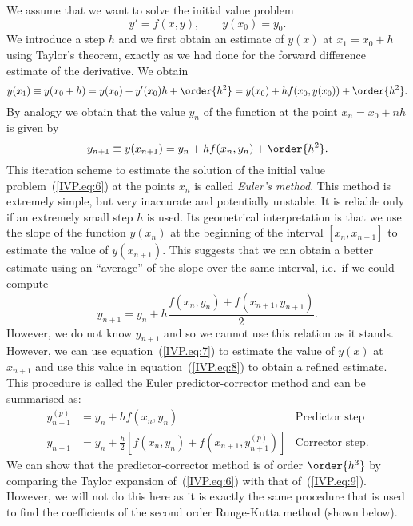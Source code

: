 We assume that we want to solve the initial value problem
%
\begin{equation}
  y' = f(x,y) , \qquad y(x_0) = y_0 .
  \label{IVP.eq:6}
\end{equation}
%
We introduce a step $h$ and we first obtain an estimate of $y(x)$ at
$x_1 = x_0 + h$ using Taylor's theorem, exactly as we had done for the
forward difference estimate of the derivative.  We obtain
%
\begin{equation}
  y(x_1) \equiv y(x_0+h) = y(x_0) + y'(x_0) h + \order{h^2} =
  y(x_0) + h f(x_0,y(x_0)) + \order{h^2} .
  \label{IVP.eq:7}
\end{equation}
%
By analogy we obtain that the value $y_n$ of the function at the point
$x_n = x_0 + n h$ is given by
%
\begin{equation}
  y_{n+1} \equiv y(x_{n+1}) = y_{n} + h f(x_{n},y_{n}) + \order{h^2} .
  \label{IVP.eq:10}
\end{equation}
%
This iteration scheme to estimate the solution of the initial value
problem~(\ref{IVP.eq:6}) at the points $x_n$ is called \textit{Euler's
  method}.  This method is extremely simple, but very inaccurate and
potentially unstable.  It is reliable only if an extremely small step
$h$ is used.  Its geometrical interpretation is that we use the slope
of the function $y(x_n)$ at the beginning of the interval
$[x_n,x_{n+1}]$ to estimate the value of $y(x_{n+1})$.  This suggests
that we can obtain a better estimate using an ``average'' of the slope
over the same interval, i.e.\ if we could compute
%
\begin{equation}
  y_{n+1} = y_n + h \frac{f(x_n,y_n) + f(x_{n+1},y_{n+1})}{2} .
  \label{IVP.eq:8}
\end{equation}
%
However, we do not know $y_{n+1}$ and so we cannot use this relation
as it stands.  However, we can use equation~(\ref{IVP.eq:7}) to
estimate the value of $y(x)$ at $x_{n+1}$ and use this value in
equation~(\ref{IVP.eq:8}) to obtain a refined estimate.  This
procedure is called the Euler predictor-corrector method and can be
summarised as:
%
\begin{subequations}
  \label{IVP.eq:9}
  \begin{align}
    y^{(p)}_{n+1} &= y_n + h f(x_n,y_n) & \text{Predictor step} \\
    y_{n+1} &= y_n + \frac{h}{2}
    \left [f(x_n,y_n) + f(x_{n+1},y^{(p)}_{n+1}) \right ] &
    \text{Corrector step}.
  \end{align}
\end{subequations}
%
We can show that the predictor-corrector method is of order $\order{h^3}$
by comparing the Taylor expansion of~(\ref{IVP.eq:6}) with that
of~(\ref{IVP.eq:9}).  However, we will not do this here as it is
exactly the same procedure that is used to find the coefficients of
the second order Runge-Kutta method (shown below).

